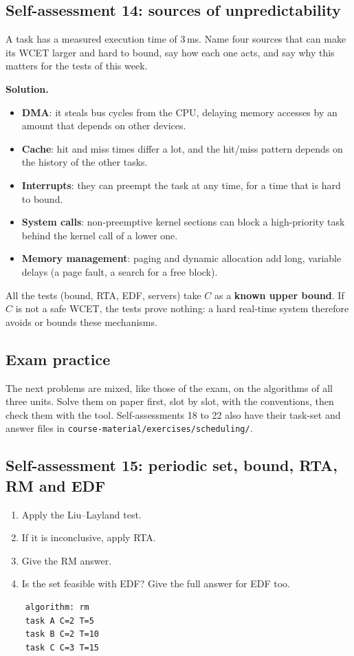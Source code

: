 \subsection*{Self-assessment 14: sources of unpredictability}
A task has a measured execution time of 3\,ms. Name four sources that can make its WCET larger and hard to bound, say how each one acts, and say why this matters for the tests of this week.

\textbf{Solution.}
\begin{itemize}
    \item \textbf{DMA}: it steals bus cycles from the CPU, delaying memory accesses by an amount that depends on other devices.
    \item \textbf{Cache}: hit and miss times differ a lot, and the hit/miss pattern depends on the history of the other tasks.
    \item \textbf{Interrupts}: they can preempt the task at any time, for a time that is hard to bound.
    \item \textbf{System calls}: non-preemptive kernel sections can block a high-priority task behind the kernel call of a lower one.
    \item \textbf{Memory management}: paging and dynamic allocation add long, variable delays (a page fault, a search for a free block).
\end{itemize}
All the tests (bound, RTA, EDF, servers) take $C$ as a \textbf{known upper bound}. If $C$ is not a safe WCET, the tests prove nothing: a hard real-time system therefore avoids or bounds these mechanisms.

\subsection*{Exam practice}
The next problems are mixed, like those of the exam, on the algorithms of all three units. Solve them on paper first, slot by slot, with the conventions, then check them with the tool. Self-assessments 18 to 22 also have their task-set and answer files in \texttt{course-material/exercises/scheduling/}.

\subsection*{Self-assessment 15: periodic set, bound, RTA, RM and EDF}
\begin{enumerate}
    \item Apply the Liu--Layland test.
    \item If it is inconclusive, apply RTA.
    \item Give the RM answer.
    \item Is the set feasible with EDF? Give the full answer for EDF too.
\end{enumerate}
\begin{lstlisting}
    algorithm: rm
    task A C=2 T=5
    task B C=2 T=10
    task C C=3 T=15
\end{lstlisting}


